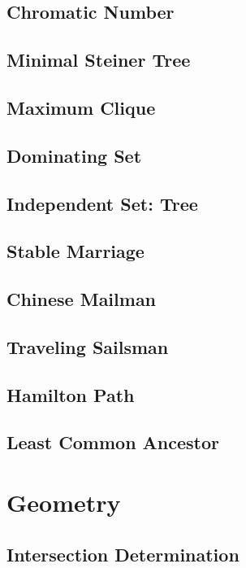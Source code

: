\documentclass{article}
\begin{document}
    \subsection{Chromatic Number}
        
    \subsection{Minimal Steiner Tree}
    \subsection{Maximum Clique}
    \subsection{Dominating Set}
        
    \subsection{Independent Set: Tree}
        
    \subsection{Stable Marriage}
        
    \subsection{Chinese Mailman}
    \subsection{Traveling Sailsman}
    \subsection{Hamilton Path}
        
    \subsection{Least Common Ancestor}
        

\section{Geometry}
    \subsection{Intersection Determination}
        
\end{document}
